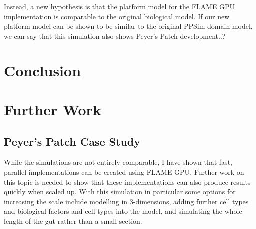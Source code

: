 \documentclass{UoYCSproject}
\begin{document}
Instead, a new hypothesis is that the platform model for the \gls{FLAME GPU} implementation is comparable to the original biological model.
If our new platform model can be shown to be similar to the original PPSim domain model, we can say that this simulation also shows Peyer's Patch development..?


\section{Conclusion}



\section{Further Work}
\subsection{Peyer's Patch Case Study}
While the simulations are not entirely comparable, I have shown that fast, parallel implementations can be created using \gls{FLAME GPU}.
Further work on this topic is needed to show that these implementations can also produce results quickly when scaled up.
With this simulation in particular some options for increasing the scale include modelling in 3-dimensions, adding further cell types and biological factors and cell types into the model, and simulating the whole length of the gut rather than a small section.
\end{document}
